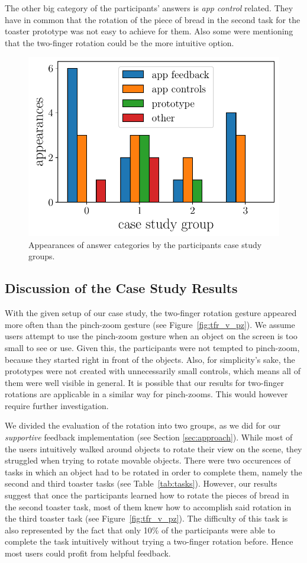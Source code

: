\documentclass[manuscript]{acmart}
\begin{document}
			The other big category of the participants' answers is \emph{app control} related. They have in common that the rotation of the piece of bread in the second task for the toaster prototype was not easy to achieve for them. Also some were mentioning that the two-finger rotation could be the more intuitive option.

			\begin{figure}[H]
				\centering
				\includegraphics[width=.49\textwidth]{img/plot/plot_tags_implementations.pdf}
				\caption{Appearances of answer categories by the participants case study groups.}
				\label{fig:tags_imp}
			\end{figure}

		\subsection{Discussion of the Case Study Results}\label{ssec:discussion}
			With the given setup of our case study, the two-finger rotation gesture appeared more often than the pinch-zoom gesture (see Figure~\ref{fig:tfr_v_pz}). We assume users attempt to use the pinch-zoom gesture when an object on the screen is too small to see or use. Given this, the participants were not tempted to pinch-zoom, because they started right in front of the objects. Also, for simplicity's sake, the prototypes were not created with unnecessarily small controls, which means all of them were well visible in general. It is possible that our results for two-finger rotations are applicable in a similar way for pinch-zooms. This would however require further investigation.

			We divided the evaluation of the rotation into two groups, as we did for our \emph{supportive} feedback implementation (see Section \ref{sec:approach}). While most of the users intuitively walked around objects to rotate their view on the scene, they struggled when trying to rotate movable objects. There were two occurences of tasks in which an object had to be rotated in order to complete them, namely the second and third toaster tasks (see Table~\ref{tab:tasks}). However, our results suggest that once the participants learned how to rotate the pieces of bread in the second toaster task, most of them knew how to accomplish said rotation in the third toaster task (see Figure~\ref{fig:tfr_v_pz}). The difficulty of this task is also represented by the fact that only 10\% of the participants were able to complete the task intuitively without trying a two-finger rotation before. Hence most users could profit from helpful feedback.
\end{document}
